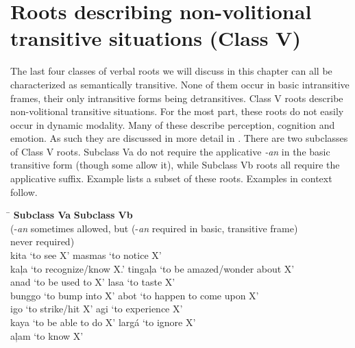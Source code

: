 \section{Roots describing non-volitional transitive situations (Class V)}

The last four classes of verbal roots we will discuss in this chapter can all be characterized as semantically transitive. None of them occur in basic intransitive frames, their only intransitive forms being detransitives. Class V roots describe non-volitional transitive situations. For the most part, these roots do not easily occur in dynamic modality. Many of these describe perception, cognition and emotion. As such they are discussed in more detail in . There are two subclasses of Class V roots. Subclass Va do not require the applicative \textit{{}-an} in the basic transitive form (though
%
 some  allow it), while Subclass Vb roots all require the applicative suffix. Example  lists a subset of these roots. Examples in context follow. 

\ea
\label{bkm:Ref150247189}
\begin{tabbing}\hspace{5cm}\= \kill
\textbf{Subclass Va}    \>     \textbf{Subclass Vb} \\
(-\textit{an} sometimes allowed, but \>   (-\textit{an} required in basic, transitive frame) \\
never required) \\
kita ‘to see X’   \>     masmas ‘to notice X’ \\
kaļa ‘to recognize/know X.’ \> tingaļa ‘to be amazed/wonder about X’ \\
anad ‘to be used to X’  \>    lasa ‘to taste X’ \\
bunggo ‘to bump into X’   \>   abot ‘to happen to come upon X’ \\
igo ‘to strike/hit X’   \>   agi ‘to experience X’ \\
kaya ‘to be able to do X’ \>   largá  ‘to ignore X’ \\
\>          aļam ‘to know X’
\end{tabbing}
\z


